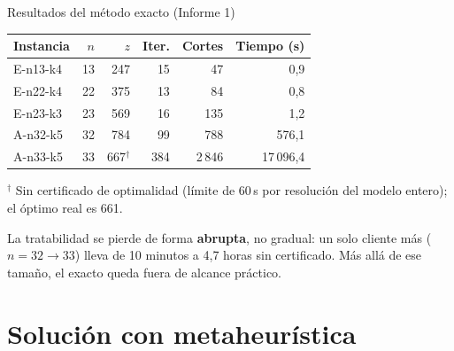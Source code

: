 \documentclass[aspectratio=169, 11pt, xcolor={dvipsnames,table}]{beamer}
\newcommand{\azul}[1]{\textcolor{UsachAzul}{#1}}
\newcommand{\naranja}[1]{\textcolor{UsachNaranja}{#1}}
\begin{document}
\begin{frame}{Resultados del método exacto (Informe 1)}
\centering
\footnotesize
\setlength{\tabcolsep}{7pt}
\begin{tabular}{@{}lrrrrr@{}}
\toprule
\textbf{Instancia} & $n$ & $z$ & \textbf{Iter.} & \textbf{Cortes} & \textbf{Tiempo (s)} \\
\midrule
E-n13-k4 & 13 & 247 & 15  & 47   & 0{,}9 \\
E-n22-k4 & 22 & 375 & 13  & 84   & 0{,}8 \\
E-n23-k3 & 23 & 569 & 16  & 135  & 1{,}2 \\
A-n32-k5 & 32 & 784 & 99  & 788  & 576{,}1 \\
A-n33-k5 & 33 & \naranja{667}\;$^{\dagger}$ & 384 & 2\,846 & \naranja{17\,096{,}4} \\
\bottomrule
\end{tabular}
\vspace{3pt}

{\scriptsize $^{\dagger}$ Sin certificado de optimalidad (límite de 60\,s por resolución del modelo entero); el óptimo real es 661.}
\vspace{4pt}
\begin{ideaclave}
\footnotesize
La tratabilidad se pierde de forma \textbf{abrupta}, no gradual: \azul{un solo cliente más} ($n=32 \to 33$) lleva de 10 minutos a \naranja{4,7 horas sin certificado}. Más allá de ese tamaño, el exacto queda fuera de alcance práctico.
\end{ideaclave}
\end{frame}

\section{Solución con metaheurística}
\end{document}

